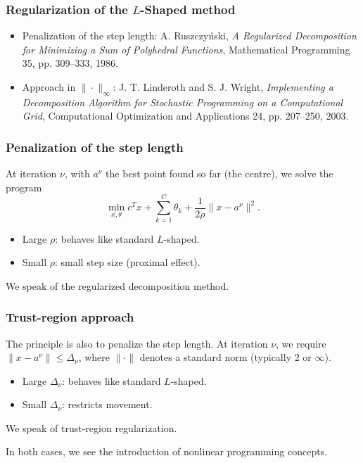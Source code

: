 \documentclass[aspectratio=169]{beamer}
\begin{document}
\begin{frame}
\frametitle{Regularization of the $L$-Shaped method}

\vspace*{-3mm}

\begin{itemize}
\item
{\blue Penalization of the step length}: A. Ruszczy\'nski, \textit{A
Regularized Decomposition for Minimizing a Sum of Polyhedral
Functions}, Mathematical Programming 35, pp. 309--333, 1986.
\item
{\blue Approach in $\|\cdot\|_\infty$}: J. T. Linderoth and S. J. Wright, \textit{Implementing a Decomposition Algorithm for Stochastic Programming on a
Computational Grid}, Computational Optimization and Applications 24,
pp. 207--250, 2003.
\end{itemize}

\end{frame}

\begin{frame}
\frametitle{Penalization of the step length}

At iteration $\nu$, with $a^{\nu}$ the best point found so far (the centre), we solve the program
\[
\min_{x, \theta} c^Tx + \sum_{k = 1}^C \theta_k + \frac{1}{2\rho} \| x-a^{\nu} \|^2.
\]
\begin{itemize}
\item
Large $\rho$: behaves like standard $L$-shaped.
\item
Small $\rho$: small step size (proximal effect).
\end{itemize}
We speak of the {\blue regularized decomposition method}.

\end{frame}

\begin{frame}
\frametitle{Trust-region approach}

The principle is also to penalize the step length.
At iteration $\nu$, we require $\| x-a^{\nu} \| \leq \Delta_{\nu}$, where $\| \cdot \|$ denotes a standard norm (typically 2 or $\infty$).

\begin{itemize}
\item
Large $\Delta_{\nu}$: behaves like standard $L$-shaped.
\item
Small $\Delta_{\nu}$: restricts movement.
\end{itemize}

We speak of {\blue trust-region regularization}.

\mbox{}

In both cases, we see the introduction of {\blue nonlinear programming} concepts.

\end{frame}
\end{document}
